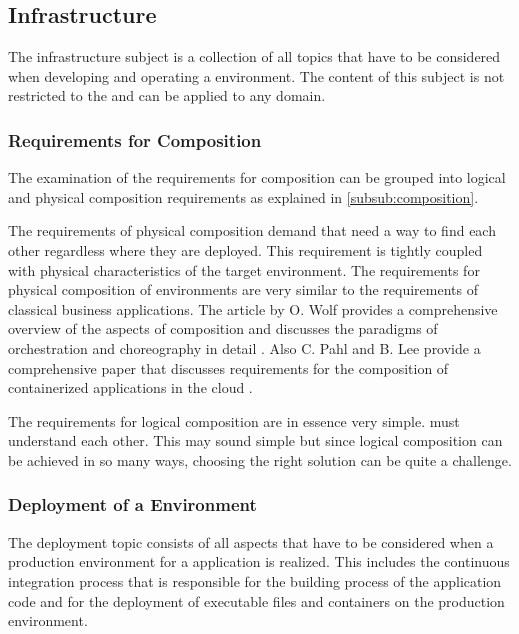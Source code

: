 \subsection{\msuc{} Infrastructure}
\label{sub:infrastructure}

The \ms{} infrastructure subject is a collection of all topics that have to be
considered when developing and operating a \ms{} environment. The content of
this subject is not restricted to the \ogs{} and can be applied to any domain. 

\subsubsection{Requirements for \msuc{} Composition}

The examination of the requirements for \ms{} composition can be grouped into
logical and physical composition requirements as explained in
\autoref{subsub:composition}.

The requirements of physical composition demand that \mss{} need a way to find
each other regardless where they are deployed. This requirement is tightly
coupled with physical characteristics of the target environment. The
requirements for physical composition of \ms{} \og{} environments are very
similar to the requirements of classical business applications. The article by
O. Wolf provides a comprehensive overview of the aspects of \ms{} composition
and discusses the paradigms of orchestration and choreography in detail
\cite{wolf_ms}. Also C. Pahl and B. Lee provide a comprehensive paper that
discusses requirements for the composition of containerized applications in the
cloud \cite{pahl2015containers}.

The requirements for logical composition are in essence very simple. \mssuc{}
must understand each other. This may sound simple but since logical composition can
be achieved in so many ways, choosing the right solution can be quite a
challenge.

\subsubsection{Deployment of a \msuc{} Environment}

The deployment topic consists of all aspects that have to be considered when a
production environment for a \ms{} application is realized. This includes the
continuous integration process that is responsible for the building process of
the application code and for the deployment of executable files and containers
on the production environment.

